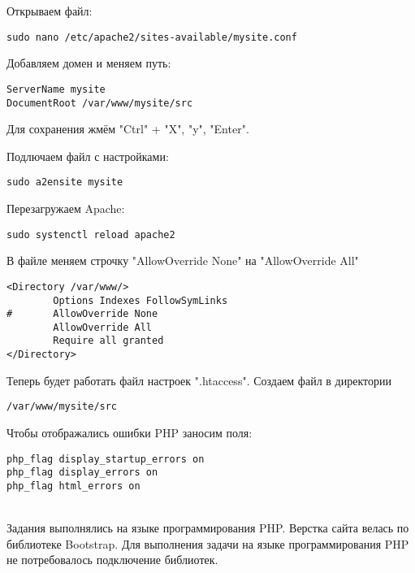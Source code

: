Открываем файл:

\begin{verbatim}
sudo nano /etc/apache2/sites-available/mysite.conf
\end{verbatim}

Добавляем домен и меняем путь:

\begin{verbatim}
ServerName mysite
DocumentRoot /var/www/mysite/src
\end{verbatim}

Для сохранения жмём "Ctrl" + "X", "y", "Enter".

Подлючаем файл с настройками:

\begin{verbatim}
sudo a2ensite mysite
\end{verbatim}

Перезагружаем Apache:

\begin{verbatim}
sudo systenctl reload apache2
\end{verbatim}

В файле меняем строчку "AllowOverride None" на "AllowOverride All"

\begin{verbatim}
<Directory /var/www/>
        Options Indexes FollowSymLinks
#       AllowOverride None
        AllowOverride All
        Require all granted
</Directory>
\end{verbatim}

Теперь будет работать файл настроек ".htaccess". Создаем файл в директории

\begin{verbatim}
/var/www/mysite/src
\end{verbatim}

Чтобы отображались ошибки PHP заносим поля:

\begin{verbatim}
php_flag display_startup_errors on
php_flag display_errors on
php_flag html_errors on
\end{verbatim}

\hspace{0pt}\\

Задания выполнялись на языке программирования PHP. Верстка сайта велась по библиотеке Bootstrap. Для выполнения задачи на языке программирования PHP не потребовалось подключение библиотек. 

\hspace{0pt}

